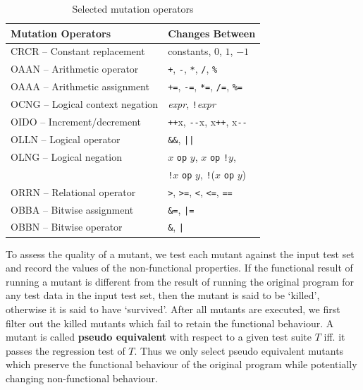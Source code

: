 \begin{table}[t]
\caption{Selected mutation operators}
\label{tab:cmop} 
\begin{center}
\begin{tabular}{ | l | l |}
  \hline
  Mutation Operators & Changes Between \\ 
\hline
 CRCR -- Constant replacement & constants, $0$, $1$, $-1$ \\
 OAAN -- Arithmetic operator & \texttt{+}, \texttt{-}, \texttt{*}, \texttt{/}, \texttt{\%} \\
 OAAA -- Arithmetic assignment & \texttt{+=}, \texttt{-=}, \texttt{*=}, \texttt{/=}, \texttt{\%=} \\
 OCNG -- Logical context negation & \textit{expr}, \texttt{!}\textit{expr} \\
 OIDO -- Increment/decrement & \texttt{++}x, \texttt{{-}-}x, x\texttt{++}, x\texttt{{-}-} \\
  OLLN -- Logical operator & \texttt{\&\&}, \texttt{||} \\ 
  OLNG -- Logical negation & $x$ \texttt{op} $y$, $x$ \texttt{op} \texttt{!}$y$,
  \\
  & \texttt{!}$x$ \texttt{op} $y$, \texttt{!}($x$ \texttt{op} $y$)\\
  ORRN -- Relational operator & \texttt{>}, \texttt{>=}, \texttt{<}, \texttt{<=}, \texttt{==} \\
  OBBA -- Bitwise assignment & \texttt{\&=}, \texttt{|=} \\
  OBBN -- Bitwise operator & \texttt{\&}, \texttt{|} \\
\hline
\end{tabular} 
\vspace*{-9mm}
\end{center} 
\end{table} 

To assess the quality of a mutant, we test each mutant against the input test set and record the values of the non-functional properties. If the functional result of running a mutant is different from the result of running the original program for any test data in the input test set, then the mutant is said to be `killed', otherwise it is said to have `survived'. 
After all mutants are executed, we first filter out the killed mutants
which fail to retain the functional behaviour. A mutant is called
\textbf{pseudo equivalent} with respect to a given test suite $T$ iff. it
passes the regression test of $T$.  Thus we only select pseudo equivalent
mutants which preserve the functional behaviour of the original program
while potentially changing non-functional behaviour. 

